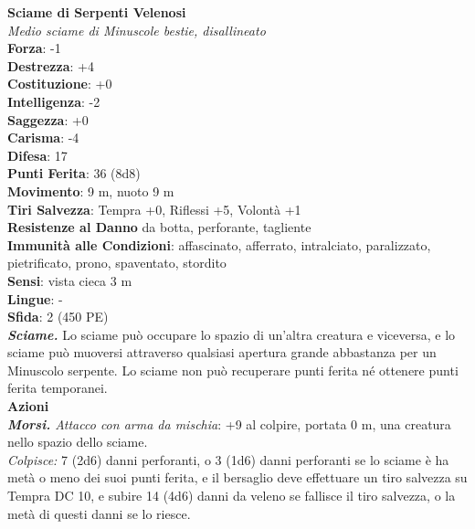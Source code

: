 \begin{multicols}{2}
\medskip\textbf{Sciame di Serpenti Velenosi}\\
\emph{Medio sciame di Minuscole bestie, disallineato}\\
\textbf{Forza}: -1\\
\textbf{Destrezza}: +4\\
\textbf{Costituzione}: +0\\
\textbf{Intelligenza}: -2\\
\textbf{Saggezza}: +0\\
\textbf{Carisma}: -4\\
\textbf{Difesa}: 17\\
\textbf{Punti Ferita}: 36 (8d8)\\
\textbf{Movimento}: 9 m, nuoto 9 m\\
\textbf{Tiri Salvezza}: Tempra +0, Riflessi +5, Volontà +1\\
\textbf{Resistenze al Danno} da botta, perforante, tagliente\\
\textbf{Immunità alle Condizioni}: affascinato, afferrato, intralciato, paralizzato, pietrificato, prono, spaventato, stordito\\
\textbf{Sensi}: vista cieca 3 m\\
\textbf{Lingue}: -\\
\textbf{Sfida}: 2 (450 PE)\smallskip\\
\emph{\textbf{Sciame.}} Lo sciame può occupare lo spazio di un'altra creatura e viceversa, e lo sciame può muoversi attraverso qualsiasi apertura grande abbastanza per un Minuscolo serpente. Lo sciame non può recuperare punti ferita né ottenere punti ferita temporanei.\\
\smallskip\textbf{Azioni}\\
\emph{\textbf{Morsi.} Attacco con arma da mischia}: +9 al colpire, portata 0 m, una creatura nello spazio dello sciame.\\
\emph{Colpisce:} 7 (2d6) danni perforanti, o 3 (1d6) danni perforanti se lo sciame è ha metà o meno dei suoi punti ferita, e il bersaglio deve effettuare un tiro salvezza su Tempra DC 10, e subire 14 (4d6) danni da veleno se fallisce il tiro salvezza, o la metà di questi danni se lo riesce.\\


\end{multicols}
